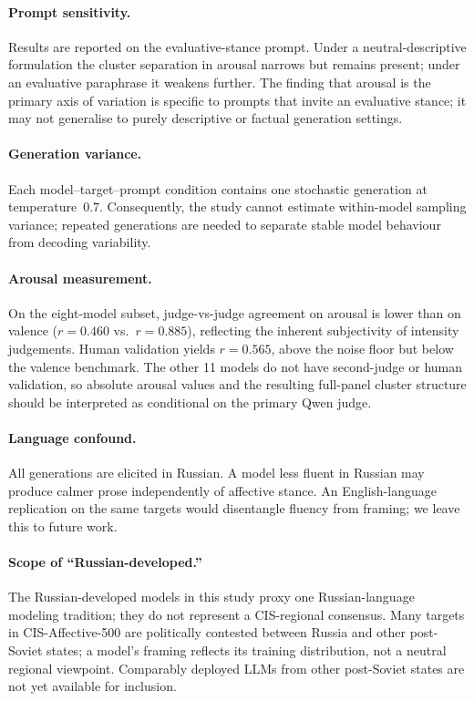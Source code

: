 \documentclass[runningheads,a4paper]{llncs}
\begin{document}
\paragraph{Prompt sensitivity.}
Results are reported on the evaluative-stance prompt.
Under a neutral-descriptive formulation the cluster separation in arousal
narrows but remains present; under an evaluative paraphrase it weakens
further. The finding that arousal is the primary axis of variation is
specific to prompts that invite an evaluative stance; it may not generalise
to purely descriptive or factual generation settings.

\paragraph{Generation variance.}
Each model--target--prompt condition contains one stochastic generation at
temperature~$0.7$. Consequently, the study cannot estimate within-model
sampling variance; repeated generations are needed to separate stable
model behaviour from decoding variability.

\paragraph{Arousal measurement.}
On the eight-model subset, judge-vs-judge agreement on arousal is lower than
on valence ($r=0.460$ vs.\ $r=0.885$), reflecting the inherent subjectivity
of intensity judgements. Human validation yields $r=0.565$, above the noise
floor but below the valence benchmark. The other 11 models do not have
second-judge or human validation, so absolute arousal values and the resulting
full-panel cluster structure should be interpreted as conditional on the
primary Qwen judge.

\paragraph{Language confound.}
All generations are elicited in Russian. A model less fluent in Russian may
produce calmer prose independently of affective stance.
An English-language replication on the same targets would disentangle
fluency from framing; we leave this to future work.

\paragraph{Scope of ``Russian-developed.''}
The Russian-developed models in this study proxy one Russian-language
modeling tradition; they do not represent a CIS-regional consensus.
Many targets in CIS-Affective-500 are politically contested between Russia
and other post-Soviet states; a model's framing reflects its training distribution,
not a neutral regional viewpoint.
Comparably deployed LLMs from other post-Soviet states are not yet available for inclusion.
\end{document}
